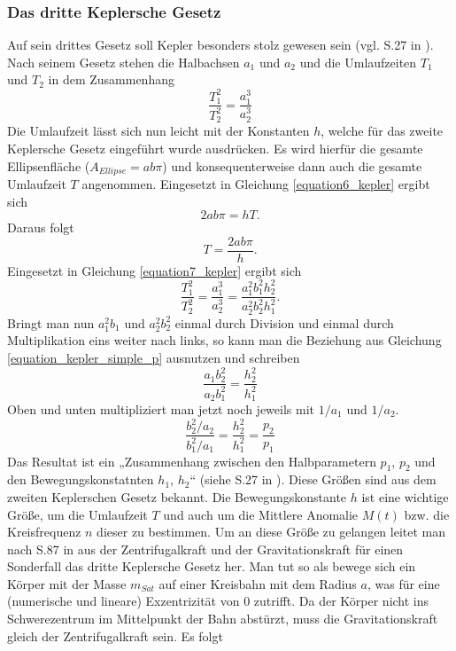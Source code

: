 \subsubsection{Das dritte Keplersche Gesetz}
Auf sein drittes Gesetz soll Kepler besonders stolz gewesen sein (vgl. S.27 in \cite{Raumflugm}). Nach seinem Gesetz stehen die Halbachsen \ensuremath{a_1} und \ensuremath{a_2} und die Umlaufzeiten \ensuremath{T_1} und \ensuremath{T_2} in dem Zusammenhang
\begin{equation}
	\frac{T_1^2}{T_2^2}=\frac{a_1^3}{a_2^3}
	\label{equation7_kepler}
\end{equation} 
Die Umlaufzeit lässt sich nun leicht mit der Konstanten \ensuremath{h}, welche für das zweite Keplersche Gesetz eingeführt wurde ausdrücken. Es wird hierfür die gesamte Ellipsenfläche (\ensuremath{A_{Ellipse}=ab\pi}) und konsequenterweise dann auch die gesamte Umlaufzeit \ensuremath{T} angenommen. Eingesetzt in Gleichung \ref{equation6_kepler} ergibt sich
\begin{equation}
	2ab\pi=hT.
\end{equation} 
Daraus folgt
\begin{equation}
	T=\frac{2ab\pi}{h}.
	\label{equation8_kepler}
\end{equation}
Eingesetzt in Gleichung \ref{equation7_kepler} ergibt sich 
\begin{equation}
		\frac{T_1^2}{T_2^2}=\frac{a_1^3}{a_2^3}=\frac{a_1^2b_1^2h_2^2}{a_2^2b_2^2h_1^2}.
\end{equation}
Bringt man nun \ensuremath{a_1^2b_1} und \ensuremath{a_2^2b_2^2} einmal durch Division und einmal durch Multiplikation eins weiter nach links, so kann man die Beziehung aus Gleichung \ref{equation_kepler_simple_p} ausnutzen und schreiben
\begin{equation}
\frac{a_1b_2^2}{a_2b_1^2}=\frac{h_2^2}{h_1^2}
\end{equation}
Oben und unten multipliziert man jetzt noch jeweils mit \ensuremath{1/a_1} und \ensuremath{1/a_2}.
\begin{equation}
\frac{b_2^2/a_2}{b_1^2/a_1}=\frac{h_2^2}{h_1^2}=\frac{p_2}{p_1}
\end{equation}
Das Resultat ist ein „Zusammenhang zwischen den Halbparametern \ensuremath{p_1}, \ensuremath{p_2} und den Bewegungskonstatnten \ensuremath{h_1}, \ensuremath{h_2}“ (siehe S.27 in \cite{Raumflugm}). Diese Größen sind aus dem zweiten Keplerschen Gesetz bekannt. 
\newpar
Die Bewegungskonstante \ensuremath{h} ist eine wichtige Größe, um die Umlaufzeit \ensuremath{T} und auch um die Mittlere Anomalie \ensuremath{M(t)} bzw. die Kreisfrequenz \ensuremath{n} dieser zu bestimmen. Um an diese Größe zu gelangen leitet man nach S.87 in \cite{HandRaum} aus der Zentrifugalkraft und der Gravitationskraft für einen Sonderfall das dritte Keplersche Gesetz her. Man tut so als bewege sich ein Körper mit der Masse \ensuremath{m_{Sat}} auf einer Kreisbahn mit dem Radius \ensuremath{a}, was für eine (numerische und lineare) Exzentrizität von 0 zutrifft. Da der Körper nicht ins Schwerezentrum im Mittelpunkt der Bahn abstürzt, muss die Gravitationskraft gleich der Zentrifugalkraft sein. Es folgt
